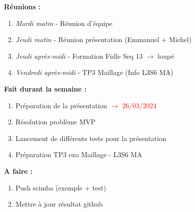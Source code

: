 \textbf{Réunions :}
\begin{enumerate}[label=\textbullet]
	\item \textit{Mardi matin} - Réunion d'équipe
	\item \textit{Jeudi matin} - Réunion présentation (Emmanuel + Michel)
	\item \textit{Jeudi après-midi} - Formation Fidle Seq 13 $\rightarrow$ loupé
	\item \textit{Vendredi après-midi} - TP3 Maillage (Info L3S6 MA)
\end{enumerate}
\textbf{Fait durant la semaine :}
\begin{enumerate}[label=\textbullet]
	\item Préparation de la présentation \textcolor{red}{$\rightarrow$ 26/03/2024}
	\item Résolution problème MVP
	\item Lancement de différents tests pour la présentation
	\item Préparation TP3 exo Maillage - L3S6 MA
\end{enumerate}
\textbf{A faire :}
\begin{enumerate}[label=\textbullet]
	\item Push scimba (exemple + test)
	\item Mettre à jour résultat github
\end{enumerate}